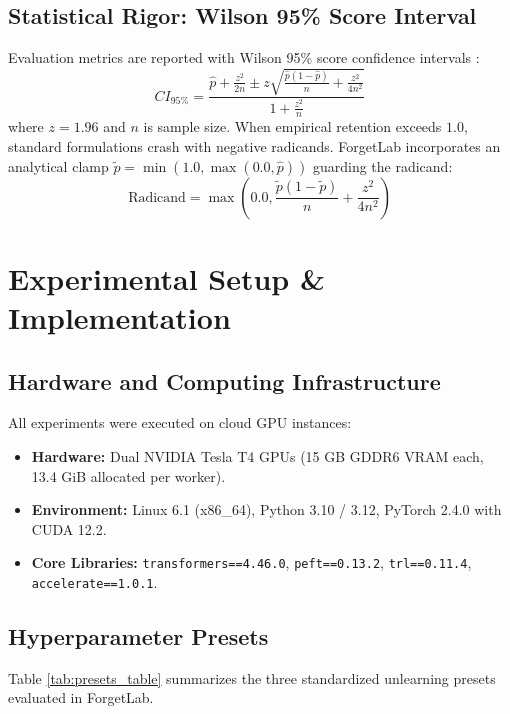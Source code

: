 \documentclass[11pt,a4paper]{article}
\begin{document}
\subsection{Statistical Rigor: Wilson 95\% Score Interval}
Evaluation metrics are reported with Wilson 95\% score confidence intervals \cite{wilson1927probable}:
\begin{equation}
    CI_{95\%} = \frac{\hat{p} + \frac{z^2}{2n} \pm z \sqrt{\frac{\hat{p}(1-\hat{p})}{n} + \frac{z^2}{4n^2}}}{1 + \frac{z^2}{n}}
\end{equation}
where $z=1.96$ and $n$ is sample size. When empirical retention exceeds $1.0$, standard formulations crash with negative radicands. ForgetLab incorporates an analytical clamp $\tilde{p} = \min(1.0, \max(0.0, \hat{p}))$ guarding the radicand:
\begin{equation}
    \text{Radicand} = \max\left(0.0, \frac{\tilde{p}(1-\tilde{p})}{n} + \frac{z^2}{4n^2}\right)
\end{equation}

\section{Experimental Setup \& Implementation}
\label{sec:setup}

\subsection{Hardware and Computing Infrastructure}
All experiments were executed on cloud GPU instances:
\begin{itemize}
    \item \textbf{Hardware:} Dual NVIDIA Tesla T4 GPUs (15 GB GDDR6 VRAM each, 13.4 GiB allocated per worker).
    \item \textbf{Environment:} Linux 6.1 (x86\_64), Python 3.10 / 3.12, PyTorch 2.4.0 with CUDA 12.2.
    \item \textbf{Core Libraries:} \texttt{transformers==4.46.0}, \texttt{peft==0.13.2}, \texttt{trl==0.11.4}, \texttt{accelerate==1.0.1}.
\end{itemize}

\subsection{Hyperparameter Presets}
Table \ref{tab:presets_table} summarizes the three standardized unlearning presets evaluated in ForgetLab.
\end{document}
